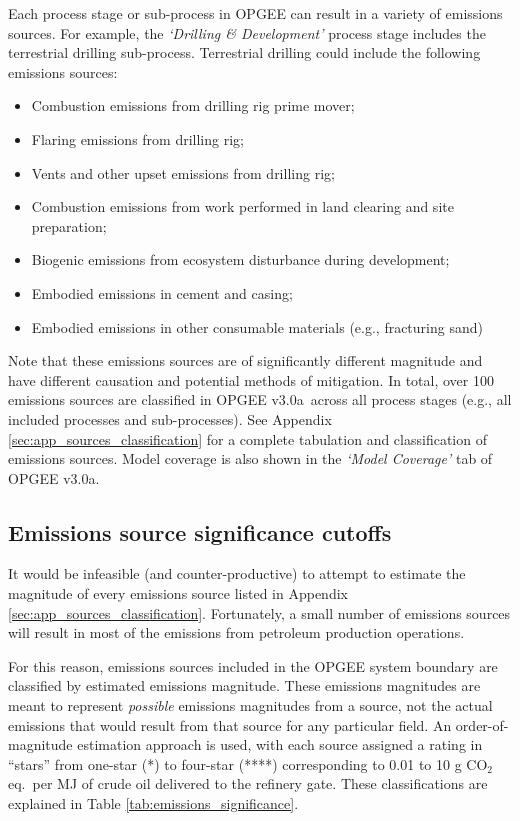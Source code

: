 \documentclass[11pt]{report}
\newcommand{\version}{v3.0a}
\newcommand{\sheet}[1]{\textit{`{#1}'}}
\begin{document}
Each process stage or sub-process in OPGEE can result in a variety of emissions sources. For example, the \sheet{Drilling \& Development} process stage includes the terrestrial drilling sub-process. Terrestrial drilling could include the following emissions sources:
\begin{itemize}
\item Combustion emissions from drilling rig prime mover;
\item Flaring emissions from drilling rig;
\item Vents and other upset emissions from drilling rig;
\item Combustion emissions from work performed in land clearing and site preparation;
\item Biogenic emissions from ecosystem disturbance during development;
\item Embodied emissions in cement and casing;
\item Embodied emissions in other consumable materials (e.g., fracturing sand)
\end{itemize}
Note that these emissions sources are of significantly different magnitude and have different causation and potential methods of mitigation. In total, over 100 emissions sources are classified in OPGEE \version \, across all process stages (e.g., all included processes and sub-processes). See Appendix \ref{sec:app_sources_classification} for a complete tabulation and classification of emissions sources.  Model coverage is also shown in the \sheet{Model Coverage} tab of OPGEE \version.



\subsection{Emissions source significance cutoffs}

It would be infeasible (and counter-productive) to attempt to estimate the magnitude of every emissions source listed in Appendix \ref{sec:app_sources_classification}. Fortunately, a small number of emissions sources will result in most of the emissions from petroleum production operations. 

For this reason, emissions sources included in the OPGEE system boundary are classified by estimated emissions magnitude. These emissions magnitudes are meant to represent \emph{possible} emissions magnitudes from a source, not the actual emissions that would result from that source for any particular field. An order-of-magnitude estimation approach is used, with each source assigned a rating in ``stars'' from one-star (*) to four-star (****) corresponding to 0.01 to 10 g CO$_2$ eq.\ per MJ of crude oil delivered to the refinery gate. These classifications are explained in Table \ref{tab:emissions_significance}.
\end{document}

